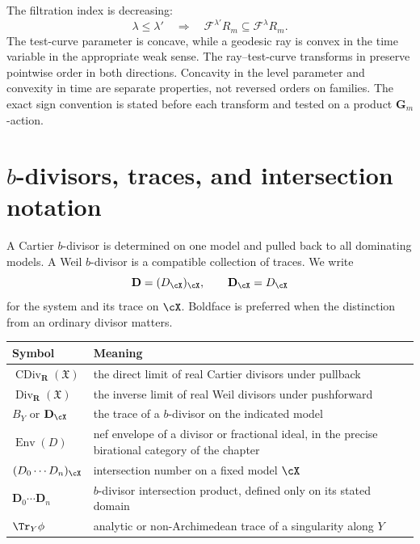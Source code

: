 The filtration index is decreasing:
\[
 \lambda\leq\lambda'
 \quad\Longrightarrow\quad
 \mathcal F^{\lambda'}R_m\subseteq\mathcal F^\lambda R_m.
\]
The test-curve parameter is concave, while a geodesic ray is convex in the
time variable in the appropriate weak sense.  The ray--test-curve transforms in  preserve
pointwise order in both directions. Concavity in the level parameter and
convexity in time are separate properties, not reversed orders on families.  The exact sign convention is stated before each
transform and tested on a product \(\mathbf G_m\)-action.

\section[b-divisors, traces, and intersections]{\texorpdfstring{\(b\)-divisors}{b-divisors}, traces, and intersection notation}
\label{sec:appK-bdivisors}


A Cartier \(b\)-divisor is determined on one model and pulled back to all
dominating models.  A Weil \(b\)-divisor is a compatible collection of
traces.  We write
\[
 \mathbf D=(D_\cX)_\cX,
 \qquad
 \mathbf D_\cX=D_\cX
\]
for the system and its trace on \(\cX\).  Boldface is preferred when the
distinction from an ordinary divisor matters.

\begin{center}
\begin{tabular}{@{}p{}p{}@{}}
\toprule
Symbol & Meaning \\
\midrule
\(\operatorname{CDiv}_{\mathbf R}(\mathfrak X)\)
  & the direct limit of real Cartier divisors under pullback \\
\(\operatorname{Div}_{\mathbf R}(\mathfrak X)\)
  & the inverse limit of real Weil divisors under pushforward \\
\(B_Y\) or \(\mathbf D_\cX\)
  & the trace of a \(b\)-divisor on the indicated model \\
\(\operatorname{Env}(D)\)
  & nef envelope of a divisor or fractional ideal, in the precise
    birational category of the chapter \\
\((D_0\cdots D_n)_\cX\)
  & intersection number on a fixed model \(\cX\) \\
\(\mathbf D_0\cdots\mathbf D_n\)
  & \(b\)-divisor intersection product, defined only on its stated domain \\
\(\Tr_Y\phi\)
  & analytic or non-Archimedean trace of a singularity along \(Y\) \\
\bottomrule
\end{tabular}
\end{center}

